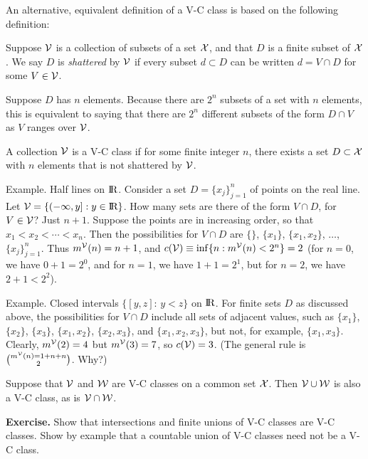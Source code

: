 An alternative, equivalent definition of a V-C class is based on the following definition:
\begin{Definition}
        Suppose ${\cal V}$ is a collection of subsets of a set ${\cal X}$, and that $D$ is a finite
        subset of ${\cal X}$.
        We say $D$ is {\em shattered} by ${\cal V}$ if every subset $d \subset D$
        can be written $d = V \cap D$ for some $V \in {\cal V}$.
\end{Definition}

Suppose $D$ has $n$ elements.
Because there are $2^n$ subsets of a set with $n$ elements, this is equivalent to saying
that there are $2^n$ different subsets of the form $D \cap V$ as $V$ ranges over ${\cal V}$.

A collection ${\cal V}$ is a V-C class if for some finite integer $n$, there exists a set
$D \subset {\cal X}$ with $n$ elements that is not shattered by ${\cal V}$.

Example. Half lines on $\hbox{I\kern-.17em\hbox{R}}$.
Consider a set $D = \{x_j\}_{j=1}^n$ of points on the real line.
Let ${\cal V} = \{ (-\infty, y] : y \in \hbox{I\kern-.17em\hbox{R}} \}$.
How many sets are there  of the form $V \cap D$, for $V \in {\cal V}$?
Just $n+1$.
Suppose the points are in increasing order, so that $x_1 < x_2 < \cdots < x_n$.
Then the possibilities for $V \cap D$ are $\{ \}$,
$\{ x_1 \}$, $\{ x_1, x_2 \}$, $\ldots$, $\{x_j \}_{j=1}^n$.
Thus $m^{{\cal V}}(n) = n+1$, and $c({\cal V}) \equiv \inf \{ n : m^{\cal V}(n) < 2^n \} = 2$
(for $n=0$, we have $0+1 = 2^0$, and for $n=1$,
we have $1+1 = 2^1$, but for $n=2$, we have $2+1 < 2^2$).

Example. Closed intervals $\{[y, z]$: $y < z\}$ on $\hbox{I\kern-.17em\hbox{R}}$.
For finite sets $D$ as discussed above,
the possibilities for $V \cap D$ include all sets of adjacent values, such as
$\{x_1\}$, $\{x_2\}$, $\{x_3\}$, $\{x_1, x_2\}$, $\{x_2, x_3\}$, and $\{x_1, x_2, x_3\}$, but not,
for example, $\{ x_1, x_3 \}$.
Clearly, $m^{{\cal V}}(2) = 4$ but $m^{{\cal V}}(3) = 7$, so $c({\cal V}) = 3$.
(The general rule is $m^{{\cal V}}(n) = 1 + n + {n}\choose{2}$. Why?)

Suppose that ${\cal V}$ and ${\cal W}$ are V-C classes on a common set ${\cal X}$.
Then ${\cal V} \cup {\cal W}$ is also a V-C class, as is ${\cal V} \cap {\cal W}$.


\noindent
{\bf Exercise.}
Show that intersections and finite unions of V-C classes are V-C classes.
Show by example that a countable union of V-C classes need not
be a V-C class.

